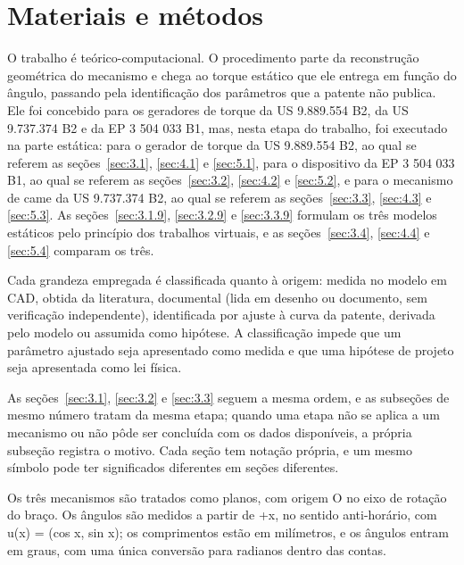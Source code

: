 
\chapter{Materiais e métodos}\label{sec:3}

O trabalho é teórico-computacional. O procedimento parte da reconstrução geométrica do mecanismo e chega ao torque estático que ele entrega em função do ângulo, passando pela identificação dos parâmetros que a patente não publica. Ele foi concebido para os geradores de torque da US 9.889.554 B2, da US 9.737.374 B2 e da EP 3 504 033 B1, mas, nesta etapa do trabalho, foi executado na parte estática: para o gerador de torque da US 9.889.554 B2, ao qual se referem as seções~\ref{sec:3.1}, \ref{sec:4.1} e \ref{sec:5.1}, para o dispositivo da EP 3 504 033 B1, ao qual se referem as seções~\ref{sec:3.2}, \ref{sec:4.2} e \ref{sec:5.2}, e para o mecanismo de came da US 9.737.374 B2, ao qual se referem as seções~\ref{sec:3.3}, \ref{sec:4.3} e \ref{sec:5.3}. As seções~\ref{sec:3.1.9}, \ref{sec:3.2.9} e \ref{sec:3.3.9} formulam os três modelos estáticos pelo princípio dos trabalhos virtuais, e as seções~\ref{sec:3.4}, \ref{sec:4.4} e \ref{sec:5.4} comparam os três.

Cada grandeza empregada é classificada quanto à origem: medida no modelo em CAD, obtida da literatura, documental (lida em desenho ou documento, sem verificação independente), identificada por ajuste à curva da patente, derivada pelo modelo ou assumida como hipótese. A classificação impede que um parâmetro ajustado seja apresentado como medida e que uma hipótese de projeto seja apresentada como lei física.

As seções~\ref{sec:3.1}, \ref{sec:3.2} e \ref{sec:3.3} seguem a mesma ordem, e as subseções de mesmo número tratam da mesma etapa; quando uma etapa não se aplica a um mecanismo ou não pôde ser concluída com os dados disponíveis, a própria subseção registra o motivo. Cada seção tem notação própria, e um mesmo símbolo pode ter significados diferentes em seções diferentes.

Os três mecanismos são tratados como planos, com origem O no eixo de rotação do braço. Os ângulos são medidos a partir de +x, no sentido anti-horário, com u(x) = (cos x, sin x); os comprimentos estão em milímetros, e os ângulos entram em graus, com uma única conversão para radianos dentro das contas.

